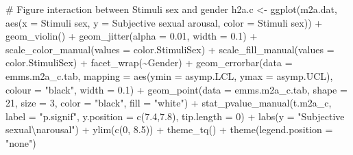 \documentclass[
  bookmarksnumbered]{article}
\newenvironment{Shaded}{\begin{snugshade}}{\end{snugshade}}
\newcommand{\AttributeTok}[1]{\textcolor[rgb]{0.80,0.80,0.80}{#1}}
\newcommand{\CommentTok}[1]{\textcolor[rgb]{0.50,0.62,0.50}{#1}}
\newcommand{\DecValTok}[1]{\textcolor[rgb]{0.86,0.86,0.80}{#1}}
\newcommand{\FloatTok}[1]{\textcolor[rgb]{0.75,0.75,0.82}{#1}}
\newcommand{\FunctionTok}[1]{\textcolor[rgb]{0.94,0.94,0.56}{#1}}
\newcommand{\NormalTok}[1]{\textcolor[rgb]{0.80,0.80,0.80}{#1}}
\newcommand{\OtherTok}[1]{\textcolor[rgb]{0.94,0.94,0.56}{#1}}
\newcommand{\SpecialCharTok}[1]{\textcolor[rgb]{0.86,0.64,0.64}{#1}}
\newcommand{\StringTok}[1]{\textcolor[rgb]{0.80,0.58,0.58}{#1}}
\begin{document}
\begin{Shaded}
\begin{Highlighting}[]
\CommentTok{\# Figure interaction between Stimuli sex and gender}
\NormalTok{h2a.c }\OtherTok{\textless{}{-}} \FunctionTok{ggplot}\NormalTok{(m2a.dat, }\FunctionTok{aes}\NormalTok{(}\AttributeTok{x =} \StringTok{\textasciigrave{}}\AttributeTok{Stimuli sex}\StringTok{\textasciigrave{}}\NormalTok{, }
                             \AttributeTok{y =} \StringTok{\textasciigrave{}}\AttributeTok{Subjective sexual arousal}\StringTok{\textasciigrave{}}\NormalTok{, }
                             \AttributeTok{color =} \StringTok{\textasciigrave{}}\AttributeTok{Stimuli sex}\StringTok{\textasciigrave{}}\NormalTok{)) }\SpecialCharTok{+}
  \FunctionTok{geom\_violin}\NormalTok{() }\SpecialCharTok{+}
  \FunctionTok{geom\_jitter}\NormalTok{(}\AttributeTok{alpha =} \FloatTok{0.01}\NormalTok{, }\AttributeTok{width =} \FloatTok{0.1}\NormalTok{) }\SpecialCharTok{+}
  \FunctionTok{scale\_color\_manual}\NormalTok{(}\AttributeTok{values =}\NormalTok{ color.StimuliSex) }\SpecialCharTok{+}
  \FunctionTok{scale\_fill\_manual}\NormalTok{(}\AttributeTok{values =}\NormalTok{ color.StimuliSex) }\SpecialCharTok{+}
  \FunctionTok{facet\_wrap}\NormalTok{(}\SpecialCharTok{\textasciitilde{}}\NormalTok{Gender) }\SpecialCharTok{+}
  \FunctionTok{geom\_errorbar}\NormalTok{(}\AttributeTok{data =}\NormalTok{ emms.m2a\_c.tab, }
                \AttributeTok{mapping =} \FunctionTok{aes}\NormalTok{(}\AttributeTok{ymin =}\NormalTok{ asymp.LCL, }\AttributeTok{ymax =}\NormalTok{ asymp.UCL), }
                \AttributeTok{colour =} \StringTok{"black"}\NormalTok{, }\AttributeTok{width =} \FloatTok{0.1}\NormalTok{) }\SpecialCharTok{+}
  \FunctionTok{geom\_point}\NormalTok{(}\AttributeTok{data =}\NormalTok{ emms.m2a\_c.tab, }
             \AttributeTok{shape =} \DecValTok{21}\NormalTok{, }\AttributeTok{size =} \DecValTok{3}\NormalTok{,}
             \AttributeTok{color =} \StringTok{"black"}\NormalTok{, }\AttributeTok{fill =} \StringTok{"white"}\NormalTok{) }\SpecialCharTok{+}
  \FunctionTok{stat\_pvalue\_manual}\NormalTok{(t.m2a\_c, }
                     \AttributeTok{label =} \StringTok{"p.signif"}\NormalTok{, }
                     \AttributeTok{y.position =} \FunctionTok{c}\NormalTok{(}\FloatTok{7.4}\NormalTok{,}\FloatTok{7.8}\NormalTok{), }
                     \AttributeTok{tip.length =} \DecValTok{0}\NormalTok{) }\SpecialCharTok{+}
  \FunctionTok{labs}\NormalTok{(}\AttributeTok{y =} \StringTok{"Subjective sexual}\SpecialCharTok{\textbackslash{}n}\StringTok{arousal"}\NormalTok{) }\SpecialCharTok{+}
  \FunctionTok{ylim}\NormalTok{(}\FunctionTok{c}\NormalTok{(}\DecValTok{0}\NormalTok{, }\FloatTok{8.5}\NormalTok{)) }\SpecialCharTok{+}
  \FunctionTok{theme\_tq}\NormalTok{() }\SpecialCharTok{+}
  \FunctionTok{theme}\NormalTok{(}\AttributeTok{legend.position =} \StringTok{"none"}\NormalTok{)}


\end{Highlighting}
\end{Shaded}
\end{document}
